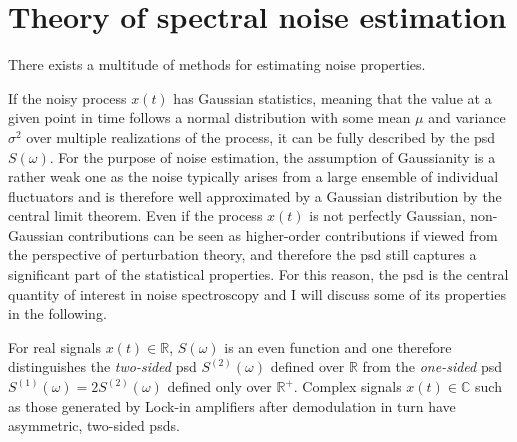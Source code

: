 \chapter{Theory of spectral noise estimation}\label{ch:speck:theory}
There exists a multitude of methods for estimating noise properties.

If the noisy process $x(t)$
has Gaussian statistics, meaning that the value at a given point in time follows a normal distribution with some mean $\mu$ and variance $\sigma^2$ over multiple realizations of the process, it can be fully described by the \gls{psd} $S(\omega)$.
For the purpose of noise estimation, the assumption of Gaussianity is a rather weak one as the noise typically arises from a large ensemble of individual fluctuators and is therefore well approximated by a Gaussian distribution by the central limit theorem.
Even if the process $x(t)$ is not perfectly Gaussian, non-Gaussian contributions can be seen as higher-order contributions if viewed from the perspective of perturbation theory, and therefore the \gls{psd} still captures a significant part of the statistical properties.
For this reason, the \gls{psd} is the central quantity of interest in noise spectroscopy and I will discuss some of its properties in the following.

For real signals $x(t) \in\mathbb{R}$, $S(\omega)$ is an even function and one therefore distinguishes the \emph{two-sided} \gls{psd} $S^{(2)}(\omega)$ defined over $\mathbb{R}$ from the \emph{one-sided} \gls{psd} $S^{(1)}(\omega) = 2 S^{(2)}(\omega)$ defined only over $\mathbb{R}^+$.
Complex signals $x(t)\in\mathbb{C}$ such as those generated by Lock-in amplifiers after demodulation in turn have asymmetric, two-sided \glspl{psd}.


